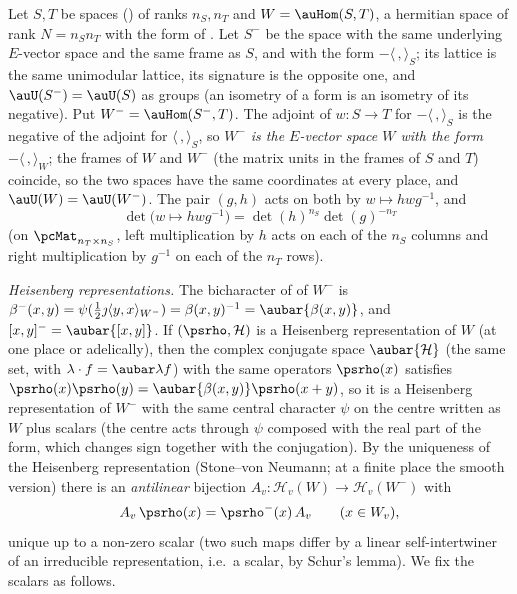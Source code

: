 \documentclass[10pt]{amsart}
\theoremstyle{definition}
\theoremstyle{remark}
\providecommand{\psHS}{\mathcal H}
\begin{document}
Let $S,T$ be spaces ({\cite[\S2.3]{P53}}) of ranks $n_S,n_T$ and $W=\auHom(S,T)$, a hermitian space of
rank $N=n_Sn_T$ with the form of {\cite[\S5.1.1]{P49}}. Let $S^-$ be the space with the same underlying
$E$-vector space and the same frame as $S$, and with the form $-\langle\,,\rangle_S$; its lattice is
the same unimodular lattice, its signature is the opposite one, and $\auU(S^-)=\auU(S)$ as groups (an
isometry of a form is an isometry of its negative). Put $W^-=\auHom(S^-,T)$. The adjoint of
$w\colon S\to T$ for $-\langle\,,\rangle_S$ is the negative of the adjoint for $\langle\,,\rangle_S$,
so \emph{$W^-$ is the $E$-vector space $W$ with the form $-\langle\,,\rangle_W$}; the frames of $W$ and
$W^-$ (the matrix units in the frames of $S$ and $T$) coincide, so the two spaces have the same
coordinates at every place, and $\auU(W)=\auU(W^-)$. The pair $(g,h)$ acts on both by $w\mapsto
hwg^{-1}$, and
\begin{equation}\label{ptf:eq-detonhom}
\det\bigl(w\mapsto hwg^{-1}\bigr)=\det(h)^{n_S}\det(g)^{-n_T}
\end{equation}
(on $\pcMat_{n_T\times n_S}$, left multiplication by $h$ acts on each of the $n_S$ columns and right
multiplication by $g^{-1}$ on each of the $n_T$ rows).

\emph{Heisenberg representations.} The bicharacter of {\cite[\S5.1.1]{P49}} of $W^-$ is
$\beta^-(x,y)=\psi(\frac12\jmath\langle y,x\rangle_{W^-})=\beta(x,y)^{-1}=\aubar{\beta(x,y)}$, and
$[x,y]^-=\aubar{[x,y]}$. If $(\psrho,\psHS)$ is a Heisenberg representation of $W$ (at one place or
adelically), then the complex conjugate space $\aubar{\psHS}$ (the same set, with $\lambda\cdot f=
\aubar\lambda f$) with the same operators $\psrho(x)$ satisfies $\psrho(x)\psrho(y)=\aubar{\beta(x,y)}
\psrho(x+y)$, so it is a Heisenberg representation of $W^-$ with the same central character
$\psi$ on the centre written as $W$ plus scalars (the centre acts through $\psi$ composed with the
real part of the form, which changes sign together with the conjugation). By the uniqueness of the
Heisenberg representation (Stone--von Neumann; at a finite place the smooth version) there is an
\emph{antilinear} bijection $A_v\colon\psHS_v(W)\to\psHS_v(W^-)$ with
\begin{equation}\label{ptf:eq-Arho}
A_v\,\psrho(x)=\psrho^-(x)\,A_v\qquad(x\in W_v),
\end{equation}
unique up to a non-zero scalar (two such maps differ by a linear self-intertwiner of an irreducible
representation, i.e.\ a scalar, by Schur's lemma). We fix the scalars as follows.
\end{document}
